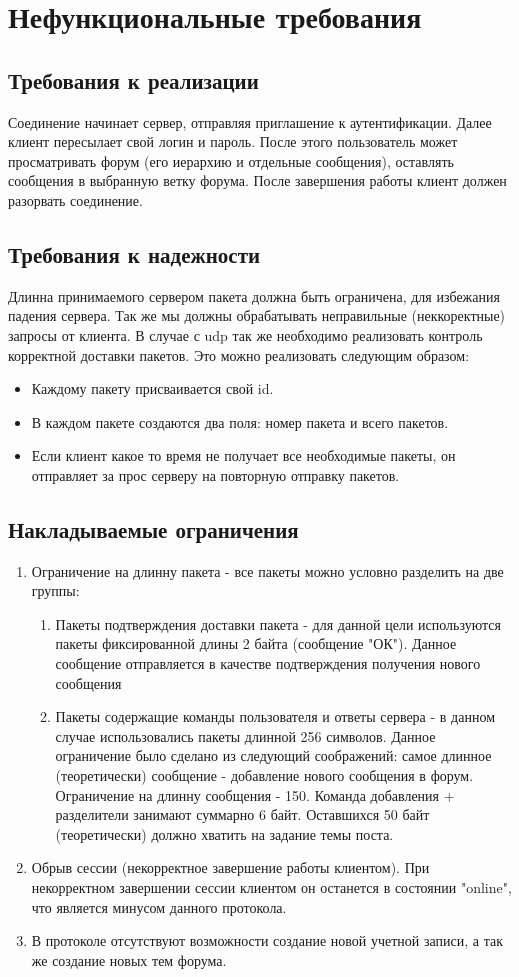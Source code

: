 \documentclass[10pt,a4paper]{report}
\begin{document}
\chapter{Нефункциональные требования}
\section{Требования к реализации}
Соединение начинает сервер, отправляя приглашение к аутентификации. Далее клиент пересылает свой логин и пароль. После этого пользователь может просматривать форум (его иерархию и отдельные сообщения), оставлять сообщения в выбранную ветку форума. После завершения работы клиент должен разорвать соединение.
\section{Требования к надежности}
Длинна принимаемого сервером пакета должна быть ограничена, для избежания падения сервера. Так же мы должны обрабатывать неправильные (неккоректные) запросы от клиента. В случае с udp так же необходимо реализовать контроль корректной доставки пакетов. Это можно реализовать следующим образом:
\begin{itemize}
\item Каждому пакету присваивается свой id.
\item В каждом пакете создаются два поля: номер пакета и всего пакетов.
\item Если клиент какое то время не получает все необходимые пакеты, он отправляет за прос серверу на повторную отправку пакетов.
\end{itemize}
\section{Накладываемые ограничения}
\begin{enumerate}
\item Ограничение на длинну пакета - все пакеты можно условно разделить на две группы:
\begin{enumerate}
\item Пакеты подтверждения доставки пакета - для данной цели используются пакеты фиксированной длины 2 байта (сообщение "ОК"). Данное сообщение отправляется в качестве подтверждения получения нового сообщения
\item Пакеты содержащие команды пользователя и ответы сервера - в данном случае использовались пакеты длинной 256 символов. Данное ограничение было сделано из следующий соображений: самое длинное (теоретически) сообщение - добавление нового сообщения в форум. Ограничение на длинну сообщения - 150. Команда добавления + разделители занимают суммарно 6 байт. Оставшихся 50 байт (теоретически) должно хватить на задание темы поста.
\end{enumerate}
\item Обрыв сессии (некорректное завершение работы клиентом). При некорректном завершении сессии клиентом он останется в состоянии "online", что является минусом данного протокола.
\item В протоколе отсутствуют возможности создание новой учетной записи, а так же создание новых тем форума.
\end{enumerate}
\end{document}
